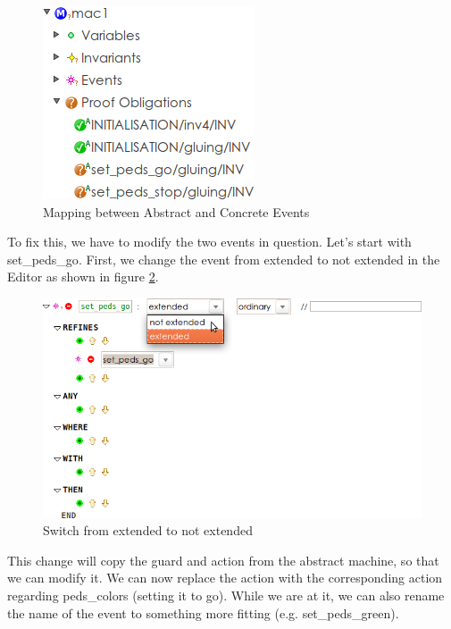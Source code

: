 \begin{figure}[!h]
\begin{center}
	\includegraphics{img/tutorial/undischarged1.png}
	\caption{Mapping between Abstract and Concrete Events}
	\label{fig_tut_07_undischarged}
\end{center}
\end{figure}

To fix this, we have to modify the two events in question.  Let's start with \textsf{set\_peds\_go}.  First, we change the event from extended to not extended in the Editor as shown in figure \ref{fig_tut_07_event_refinement}.

\begin{figure}[!h]
\begin{center}
	\includegraphics{img/tutorial/event-refinement.png}
	\caption{Switch from extended to not extended}
	\label{fig_tut_07_event_refinement}
\end{center}
\end{figure}

This change will copy the guard and action from the abstract machine, so that we can modify it.  We can now replace the action with the corresponding action regarding \textsf{peds\_colors} (setting it to \textsf{go}).  While we are at it, we can also rename the name of the event to something more fitting (e.g. \textsf{set\_peds\_green}).

